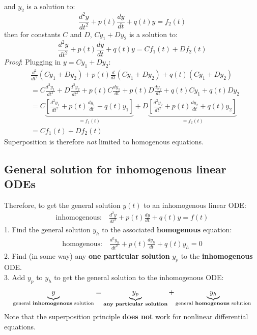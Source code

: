 \documentclass{report}
\begin{document}
and $y_2$ is a solution to:
\begin{equation*}
\frac{d^2y}{dt^2}+p(t)\frac{dy}{dt}+q(t)y=f_2(t)
\end{equation*}
then for constants $C$ and $D$, $Cy_1+Dy_2$ is a solution to:
\begin{equation*}
\frac{d^2y}{dt^2}+p(t)\frac{dy}{dt}+q(t)y=Cf_1(t)+Df_2(t)
\end{equation*}
\textit{Proof}: Plugging in $y=Cy_1+Dy_2$:
\begin{align*}
&\frac{d^2}{dt^2}(Cy_1+Dy_2)+p(t)\frac{d}{dt}(Cy_1+Dy_2)+q(t)(Cy_1+Dy_2) \\
&=C\frac{d^2y_1}{dt^2}+D\frac{d^2y_2}{dt^2}+p(t)C\frac{dy_1}{dt}+p(t)D\frac{dy_2}{dt}
+q(t)Cy_1+q(t)Dy_2\\
&=C\underbrace{\left[\frac{d^2y_1}{dt^2}+p(t)\frac{dy_1}{dt}+q(t)y_1\right]}_{=f_1(t)}
+D\underbrace{\left[\frac{d^2y_2}{dt^2}+p(t)\frac{dy_2}{dt}+q(t)y_2\right]}_{=f_2(t)}\\
&=Cf_1(t)+Df_2(t)
\end{align*}
Superposition is therefore \textit{not} limited to homogenous equations.

\subsection{General solution for inhomogenous linear ODEs} %
Therefore, to get the general solution $y(t)$ to an inhomogenous linear ODE:
\begin{align*}
\text{inhomogenous:}\quad\frac{d^2y}{dt^2}+p(t)\frac{dy}{dt}+q(t)y=f(t)
\end{align*}
1. Find the general solution $y_h$ to the associated \textbf{homogenous} equation:
\begin{align*}
\text{homogenous:}\quad\frac{d^2y_h}{dt^2}+p(t)\frac{dy_h}{dt}+q(t)y_h=0
\end{align*}
2. Find (in some way) any \textbf{one particular solution} $y_p$ to the \textbf{inhomogenous} ODE.
\\
3. Add $y_p$ to $y_h$ to get the general solution to the inhomogenous ODE:
\begin{align*}
\underbrace{y}_{\text{general \textbf{inhomogenous} solution}}=
\underbrace{y_p}_{\text{\textbf{any particular solution}}}+
\underbrace{y_h}_{\text{general \textbf{homogenous} solution}}
\end{align*}
Note that the superposition principle \textbf{does not} work for nonlinear differential equations.
\newpage
\end{document}
